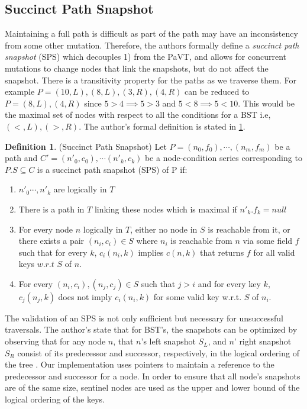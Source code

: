 \documentclass[conference]{IEEEtran}
\theoremstyle{definition}
\newtheorem{definition}{Definition}[section]
\theoremstyle{theorem}
\begin{document}
\subsection{Succinct Path Snapshot}
Maintaining a full path is difficult as part of the path may have an inconsistency from some other mutation. Therefore, the authors formally define a \textit{succinct path snapshot} (SPS) which decouples 1) from the PaVT, and allows for concurrent mutations to change nodes that link the snapshots, but do not affect the snapshot. There is a transitivity property for the paths as we traverse them. For example $P=(10,L),(8,L),(3,R),(4,R)$  can be reduced to $P=(8,L),(4,R)$ since $5>4 \implies 5 > 3$  and $5<8 \implies 5<10$. This would be the maximal set of nodes with respect to all the conditions for a BST i.e, $(<,L), (>, R)$. The author's formal definition is stated in \ref{def:def1}.
\theoremstyle{definition}
\begin{definition}{(Succinct Path Snapshot)} Let $P = (n_0, f_0),\cdots,(n_m, f_m)$ be a path and $C'=(n'_0, c_0),\cdots (n'_k, c_k)$ be a node-condition series corresponding to $P.S\subseteq C$ is a succinct path snapshot (SPS) of P if:
\begin{enumerate}
	\item $n'_0\cdots, n'_k$ are logically in $T$
	\item There is a path in $T$ linking these nodes which is maximal if $n'_k.f_k = null$
	\item For every node $n$ logically in $T$, either no node in $S$ is reachable from it, or there exists a pair $(n_i, c_i) \in S$ where $n_i$ is reachable from $n$ via some field $f$ such that for every $k$, $c_i(n_i, k)$ implies $c(n, k)$ that returns $f$ for all valid keys $w.r.t$ $S$ of $n$.
	\item For every $(n_i, c_i), (n_j, c_j) \in S$ such that $j > i$ and for every key $k$, $c_j(n_j, k)$ does not imply $c_i(n_i, k)$ for some valid key w.r.t. $S$ of $n_i$.
\end{enumerate}
\label{def:def1}
\end{definition}
The validation of an SPS is not only sufficient but necessary for unsuccessful traversals. The author's state that for BST's, the snapshots can be optimized by observing that for any node $n$, that $n$'s left snapshot $S_L$, and $n$' right snapshot $S_R$ consist of its predecessor and successor, respectively,  in the logical ordering of the tree \cite{draschler-lo}. Our implementation uses pointers to maintain a reference to the predecessor and successor for a node. In order to ensure that all node's snapshots are of the same size, sentinel nodes are used as the upper and lower bound of the logical ordering of the keys.
\end{document}
